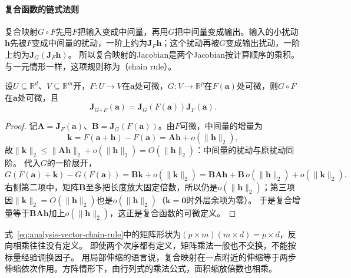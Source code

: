 \paragraph{复合函数的链式法则}
复合映射$G\circ F$先用$F$把输入变成中间量，再用$G$把中间量变成输出。输入的小扰动$\bm h$先被$F$变成中间量的扰动，一阶上约为$\bm J_F\bm h$；这个扰动再被$G$变成输出扰动，一阶上约为$\bm J_G(\bm J_F\bm h)$。
所以复合映射的Jacobian是两个Jacobian按计算顺序的乘积。与一元情形一样，这项规则称为（chain rule）。
\begin{theorem}[向量值函数的链式法则]
\label{thm:multivariable-vector-chain-rule}
设$U\subseteq\mathbb R^d$、$V\subseteq\mathbb R^m$开，$F:U\to V$在$\bm a$处可微，$G:V\to\mathbb R^p$在$F(\bm a)$处可微，则$G\circ F$在$\bm a$处可微，且
\begin{equation}
 \bm J_{G\circ F}(\bm a)=\bm J_G(F(\bm a))\bm J_F(\bm a).
\label{eq:analysis-vector-chain-rule}
\end{equation}
\end{theorem}
\begin{proof}
记$\bm A=\bm J_F(\bm a)$、$\bm B=\bm J_G(F(\bm a))$。由$F$可微，中间量的增量为
\[
 \bm k=F(\bm a+\bm h)-F(\bm a)=\bm A\bm h+o(\lVert\bm h\rVert_2),
\]
故$\lVert\bm k\rVert_2\leq\lVert\bm A\bm h\rVert_2+o(\lVert\bm h\rVert_2)=O(\lVert\bm h\rVert_2)$：中间量的扰动与原扰动同阶。
代入$G$的一阶展开，
\[
 G(F(\bm a)+\bm k)-G(F(\bm a))=\bm B\bm k+o(\lVert\bm k\rVert_2)
 =\bm B\bm A\bm h+\bm B\,o(\lVert\bm h\rVert_2)+o(\lVert\bm k\rVert_2).
\]
右侧第二项中，矩阵$\bm B$至多把长度放大固定倍数，所以仍是$o(\lVert\bm h\rVert_2)$；第三项因$\lVert\bm k\rVert_2=O(\lVert\bm h\rVert_2)$也是$o(\lVert\bm h\rVert_2)$（$\bm k=\bm0$时外层余项为零）。
于是复合增量等于$\bm B\bm A\bm h$加上$o(\lVert\bm h\rVert_2)$，这正是复合函数的可微定义。
\end{proof}
式~\eqref{eq:analysis-vector-chain-rule}中的矩阵形状为$(p\times m)(m\times d)=p\times d$，反向相乘往往没有定义。
即使两个次序都有定义，矩阵乘法一般也不交换，不能按标量经验调换因子。
用局部伸缩的语言说，复合映射在一点附近的伸缩等于两步伸缩依次作用。方阵情形下，由行列式的乘法公式，面积缩放倍数也相乘。


